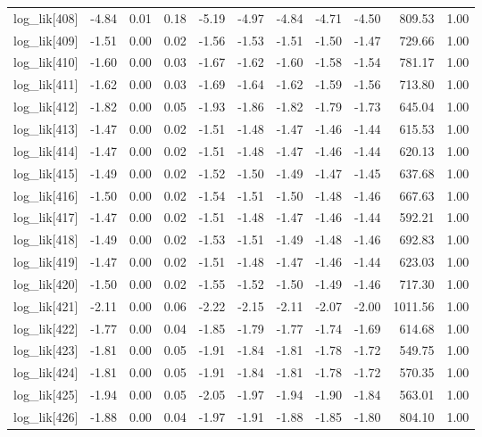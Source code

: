 \begin{table}[ht]
\begin{tabular}{rrrrrrrrrrr}
  log\_lik[408] & -4.84 & 0.01 & 0.18 & -5.19 & -4.97 & -4.84 & -4.71 & -4.50 & 809.53 & 1.00 \\ 
  log\_lik[409] & -1.51 & 0.00 & 0.02 & -1.56 & -1.53 & -1.51 & -1.50 & -1.47 & 729.66 & 1.00 \\ 
  log\_lik[410] & -1.60 & 0.00 & 0.03 & -1.67 & -1.62 & -1.60 & -1.58 & -1.54 & 781.17 & 1.00 \\ 
  log\_lik[411] & -1.62 & 0.00 & 0.03 & -1.69 & -1.64 & -1.62 & -1.59 & -1.56 & 713.80 & 1.00 \\ 
  log\_lik[412] & -1.82 & 0.00 & 0.05 & -1.93 & -1.86 & -1.82 & -1.79 & -1.73 & 645.04 & 1.00 \\ 
  log\_lik[413] & -1.47 & 0.00 & 0.02 & -1.51 & -1.48 & -1.47 & -1.46 & -1.44 & 615.53 & 1.00 \\ 
  log\_lik[414] & -1.47 & 0.00 & 0.02 & -1.51 & -1.48 & -1.47 & -1.46 & -1.44 & 620.13 & 1.00 \\ 
  log\_lik[415] & -1.49 & 0.00 & 0.02 & -1.52 & -1.50 & -1.49 & -1.47 & -1.45 & 637.68 & 1.00 \\ 
  log\_lik[416] & -1.50 & 0.00 & 0.02 & -1.54 & -1.51 & -1.50 & -1.48 & -1.46 & 667.63 & 1.00 \\ 
  log\_lik[417] & -1.47 & 0.00 & 0.02 & -1.51 & -1.48 & -1.47 & -1.46 & -1.44 & 592.21 & 1.00 \\ 
  log\_lik[418] & -1.49 & 0.00 & 0.02 & -1.53 & -1.51 & -1.49 & -1.48 & -1.46 & 692.83 & 1.00 \\ 
  log\_lik[419] & -1.47 & 0.00 & 0.02 & -1.51 & -1.48 & -1.47 & -1.46 & -1.44 & 623.03 & 1.00 \\ 
  log\_lik[420] & -1.50 & 0.00 & 0.02 & -1.55 & -1.52 & -1.50 & -1.49 & -1.46 & 717.30 & 1.00 \\ 
  log\_lik[421] & -2.11 & 0.00 & 0.06 & -2.22 & -2.15 & -2.11 & -2.07 & -2.00 & 1011.56 & 1.00 \\ 
  log\_lik[422] & -1.77 & 0.00 & 0.04 & -1.85 & -1.79 & -1.77 & -1.74 & -1.69 & 614.68 & 1.00 \\ 
  log\_lik[423] & -1.81 & 0.00 & 0.05 & -1.91 & -1.84 & -1.81 & -1.78 & -1.72 & 549.75 & 1.00 \\ 
  log\_lik[424] & -1.81 & 0.00 & 0.05 & -1.91 & -1.84 & -1.81 & -1.78 & -1.72 & 570.35 & 1.00 \\ 
  log\_lik[425] & -1.94 & 0.00 & 0.05 & -2.05 & -1.97 & -1.94 & -1.90 & -1.84 & 563.01 & 1.00 \\ 
  log\_lik[426] & -1.88 & 0.00 & 0.04 & -1.97 & -1.91 & -1.88 & -1.85 & -1.80 & 804.10 & 1.00 \\ 

\end{tabular}
\end{table}
